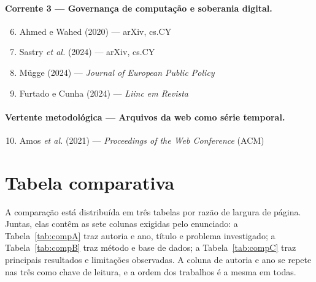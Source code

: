 \documentclass[12pt,a4paper]{article}
\begin{document}
\paragraph{Corrente 3 --- Governança de computação e soberania digital.}
\begin{enumerate}\setcounter{enumi}{5}
  \item Ahmed e Wahed (2020) --- arXiv, cs.CY
  \item Sastry \textit{et al.} (2024) --- arXiv, cs.CY
  \item Mügge (2024) --- \emph{Journal of European Public Policy}
  \item Furtado e Cunha (2024) --- \emph{Liinc em Revista}
\end{enumerate}

\paragraph{Vertente metodológica --- Arquivos da web como série temporal.}
\begin{enumerate}\setcounter{enumi}{9}
  \item Amos \textit{et al.} (2021) --- \emph{Proceedings of the Web Conference} (ACM)
\end{enumerate}

\clearpage
\section{Tabela comparativa}

A comparação está distribuída em três tabelas por razão de largura de página. Juntas,
elas contêm as sete colunas exigidas pelo enunciado: a Tabela~\ref{tab:compA} traz
autoria e ano, título e problema investigado; a Tabela~\ref{tab:compB} traz método e
base de dados; a Tabela~\ref{tab:compC} traz principais resultados e limitações
observadas. A coluna de autoria e ano se repete nas três como chave de leitura, e a
ordem dos trabalhos é a mesma em todas.
\end{document}
